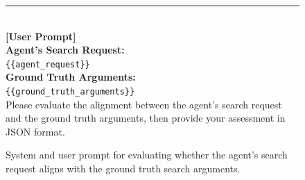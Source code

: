 \begin{figure}[t]
{\begin{tcolorbox}[colback=blue!5!white, colframe=blue!75!black, 
title=System and User Prompt for Judging Search Requests, boxrule=0.3mm, width=\textwidth, arc=3mm, auto outer arc=true]
\rule{\linewidth}{0.2pt} \\

\textbf{[User Prompt]}\\[3mm]
\textbf{Agent's Search Request:}\\
\texttt{\{\{agent\_request\}\}}\\[1mm]

\textbf{Ground Truth Arguments:}\\
\texttt{\{\{ground\_truth\_arguments\}\}}\\[1mm]

Please evaluate the alignment between the agent's search request and the ground truth arguments, then provide your assessment in JSON format.

\end{tcolorbox}
}
\caption{System and user prompt for evaluating whether the agent's search request aligns with the ground truth search arguments.}
\label{fig:judge_search_request}
\end{figure}


